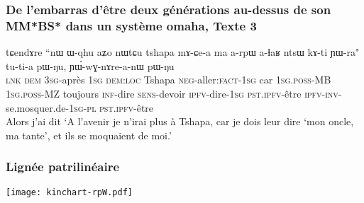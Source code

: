 \documentclass[xcolor=table]{beamer}
\newcommand{\ipa}[1]{{\phon #1}} %
\begin{document}
  \begin{frame} 
 \frametitle{De l'embarras d'être deux générations au-dessus de son MM*BS* dans un système omaha, Texte 3} 
 
 \begin{exe}
\ex 
\gll 
\ipa{tɕendɤre} 	``\ipa{nɯ} 	\ipa{ɯ-qhu} 	\ipa{aʑo} 	\ipa{nɯtɕu} 	\ipa{tshapa} 	\ipa{mɤ-ɕe-a} 	\ipa{ma} 	\ipa{a-rpɯ} 	\ipa{a-ɬaʁ} 	\ipa{ntsɯ} 	\ipa{kɤ-ti} 	\ipa{ɲɯ-ra"} 	\ipa{tu-ti-a} 	\ipa{pɯ-ŋu,} 	\ipa{ɲɯ́-wɣ-nɤre-a-nɯ} 	\ipa{pɯ-ŋu} \\
\textsc{lnk} \textsc{dem} \textsc{3sg}-après \textsc{1sg} \textsc{dem:loc} Tshapa \textsc{neg}-aller:\textsc{fact-1sg} car \textsc{1sg.poss}-MB \textsc{1sg.poss}-MZ toujours \textsc{inf}-dire \textsc{sens}-devoir \textsc{ipfv}-dire-\textsc{1sg} \textsc{pst.ipfv}-être \textsc{ipfv-inv}-se.mosquer.de-\textsc{1sg-pl} \textsc{pst.ipfv}-être \\
\glt Alors j'ai dit `A l'avenir je n'irai plus à Tshapa, car je dois leur dire `mon oncle, ma tante', et ils se moquaient de moi.'
\end{exe}
\end{frame}

  \begin{frame} 
 \frametitle{Lignée patrilinéaire} 
 \texttt{[image: kinchart-rpW.pdf]}  
\end{frame}
\end{document}
